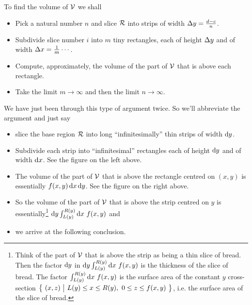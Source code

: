 To find the volume of $\mathcal{V}$ we shall
\begin{itemize}
\item
Pick a natural number $n$ and slice $\mathcal{R}$ into strips of width
$\Delta y=\frac{d-c}{n}$.
\item
  Subdivide slice number $i$ into $m$ tiny rectangles, each of height $\Delta y$ 
and of width $\Delta x=\frac{1}{m}\cdots$. 
\item 
  Compute, approximately, the volume of the part of $\mathcal{V}$ that is above 
  each rectangle.
\item
 Take the limit $m\rightarrow\infty$ and then the limit $n\rightarrow\infty$.
\end{itemize}
We have just been through this type of argument twice. So we'll
abbreviate the argument and just say
\begin{itemize}
\item
   slice the base region $\mathcal{R}$ into long ``infinitesimally'' thin strips of width $\mathrm{d}y$.
\item
   Subdivide each strip into ``infinitesimal'' rectangles each of 
height $\mathrm{d}y$ and of width $\mathrm{d}x$. See the figure on the left above.
\item
  The volume of the part of $\mathcal{V}$ that is above the rectangle centred on $(x,y)$
        is essentially $f(x,y)\,\mathrm{d}x\,\mathrm{d}y$. See the figure on 
        the right above.
\item 
   So the volume of the part of $\mathcal{V}$ that is above the strip centred on $y$
        is essentially\footnote{Think of the part of $\mathcal{V}$ that is above the                 strip as being a thin slice of bread. 
        Then the factor $\mathrm{d}y$ in $\mathrm{d}y\int_{L(y)}^{R(y)}\mathrm{d}x\ f(x,y)$
is the thickness of the slice of bread. The factor
             $\int_{L(y)}^{R(y)}\mathrm{d}x\ f(x,y)$ is the surface area
             of the constant $y$ cross-section 
             $\Set{(x,z)}{L(y)\le x\le R(y),\ 0\le z\le f(x,y)}$, i.e. 
             the surface area of the slice of bread. }
 $\mathrm{d}y\int_{L(y)}^{R(y)}\mathrm{d}x\ f(x,y)$ and  
\item
   we arrive at the following conclusion.
\end{itemize}

